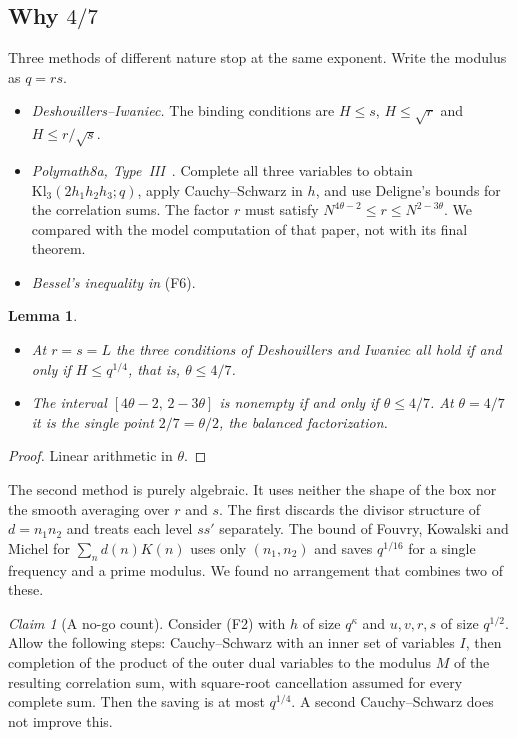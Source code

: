 \documentclass[11pt]{amsart}
\newtheorem{lemma}[theorem]{Lemma}
\theoremstyle{definition}
\theoremstyle{remark}
\newtheorem{claim}[theorem]{Claim}
\numberwithin{equation}{section}
\begin{document}
\subsection{Why $4/7$}\label{sec:why47}
Three methods of different nature stop at the same exponent.  Write the
modulus as $q=rs$.
\begin{itemize}
\item \emph{Deshouillers--Iwaniec.}  The binding conditions are $H\le s$,
$H\le\sqrt r$ and $H\le r/\sqrt s$.
\item \emph{Polymath8a, Type~III}~\cite[\S8]{Polymath8a}.  Complete all three
variables to obtain $\mathrm{Kl}_3(2h_1h_2h_3;q)$, apply Cauchy--Schwarz in
$h$, and use Deligne's bounds for the correlation sums.  The factor $r$ must
satisfy $N^{4\theta-2}\le r\le N^{2-3\theta}$.  We compared with the model
computation of that paper, not with its final theorem.
\item \emph{Bessel's inequality in} (F6).
\end{itemize}

\begin{lemma}\label{lem:tight}
\leavevmode
\begin{itemize}
\item[(i)] At $r=s=L$ the three conditions of Deshouillers and Iwaniec all
hold if and only if $H\le q^{1/4}$, that is, $\theta\le4/7$.
\item[(ii)] The interval $[4\theta-2,\,2-3\theta]$ is nonempty if and only
if $\theta\le4/7$.  At $\theta=4/7$ it is the single point $2/7=\theta/2$,
the balanced factorization.
\end{itemize}
\end{lemma}
\begin{proof}
Linear arithmetic in $\theta$.
\end{proof}

The second method is purely algebraic.  It uses neither the shape of the
box nor the smooth averaging over $r$ and $s$.  The first discards the
divisor structure of $d=n_1n_2$ and treats each level $ss'$ separately.
The bound of Fouvry, Kowalski and Michel for $\sum_nd(n)K(n)$ uses only
$(n_1,n_2)$ and saves $q^{1/16}$ for a single frequency and a prime modulus.
We found no arrangement that combines two of these.

\begin{claim}[A no-go count]\label{claim:nogo}
Consider (F2) with $h$ of size $q^{\kappa}$ and $u,v,r,s$ of size
$q^{1/2}$.  Allow the following steps: Cauchy--Schwarz with an inner set of
variables $I$, then completion of the product of the outer dual variables to
the modulus $M$ of the resulting correlation sum, with square-root
cancellation assumed for every complete sum.  Then the saving is at most
$q^{1/4}$.  A second Cauchy--Schwarz does not improve this.
\end{claim}
\end{document}
